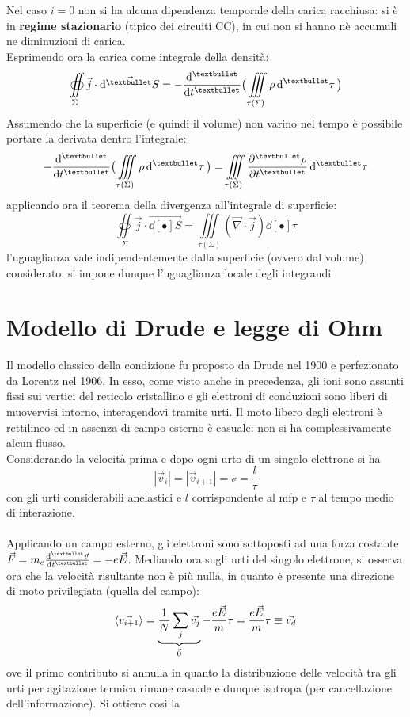 Nel caso $i = 0$ non si ha alcuna dipendenza temporale della carica racchiusa: si è in \textbf{regime stazionario} (tipico dei circuiti CC), in cui non si hanno nè accumuli ne diminuzioni di carica.
\\Esprimendo ora la carica come integrale della densità:
\[\oiint\limits_\Sigma \vec{j} \cdot \vec{\dd[•]{S}} = - \dv[•]{}{t} \big(\iiint\limits_{\tau(\Sigma)} \rho \dd[•]{\tau}\big)\]
Assumendo che la superficie (e quindi il volume) non varino nel tempo è possibile portare la derivata dentro l'integrale:
\[- \dv[•]{}{t} \big(\iiint\limits_{\tau(\Sigma)} \rho \dd[•]{\tau}\big) = \iiint\limits_{\tau(\Sigma)} \pdv[•]{\rho}{t} \dd[•]{\tau}\]
applicando ora il teorema della divergenza all'integrale di superficie:
\[\oiint\limits_\Sigma \vec{j} \cdot \vec{\dd[•]{S}} = \iiint\limits_{\tau(\Sigma)} (\vec{\nabla} \cdot \vec{j}) \dd[•]{\tau}\]
l'uguaglianza vale indipendentemente dalla superficie (ovvero dal volume) considerato: si impone dunque l'uguaglianza locale degli integrandi


\section{Modello di Drude e legge di Ohm}
Il modello classico della condizione fu proposto da Drude nel 1900 e perfezionato da Lorentz nel 1906. In esso, come visto anche in precedenza, gli ioni sono assunti fissi sui vertici del reticolo cristallino e gli elettroni di conduzioni sono liberi di muovervisi intorno, interagendovi tramite urti. Il moto libero degli elettroni è rettilineo ed in assenza di campo esterno è casuale: non si ha complessivamente alcun flusso.
\\Considerando la velocità prima e dopo ogni urto di un singolo elettrone si ha
\[|\vec{v}_i| = |\vec{v}_{i+1}| = \mathcal{v} = \frac{l}{\tau}\]
con gli urti considerabili anelastici e $l$ corrispondente al mfp e $\tau$ al tempo medio di interazione.
\\~\\
Applicando un campo esterno, gli elettroni sono sottoposti ad una forza costante $\vec{F} = m_e \dv[•]{\vec{v}}{t} = - e \vec{E}$. Mediando ora sugli urti del singolo elettrone, si osserva ora che la velocità risultante non è più nulla, in quanto è presente una direzione di moto privilegiata (quella del campo):
\[\langle \vec{v_{i+1}} \rangle = \underbrace{\frac{1}{N} \sum_j \vec{v_j}}_{\vec{0}} - \frac{e \vec{E}}{m} \tau = \frac{e \vec{E}}{m} \tau \equiv \vec{v_d}\]
ove il primo contributo si annulla in quanto la distribuzione delle velocità tra gli urti per agitazione termica rimane casuale e dunque isotropa (per cancellazione dell'informazione). Si ottiene così la

